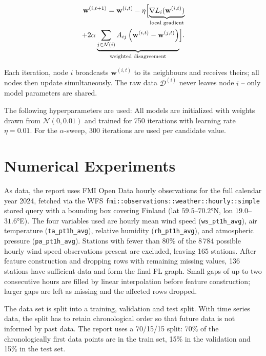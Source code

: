 \documentclass{article}
\begin{document}
\begin{equation*}
	\begin{split}
		\mathbf{w}^{(i,t+1)} = \mathbf{w}^{(i,t)} - \eta \Bigl[
		\underbrace{\nabla L_i(\mathbf{w}^{(i,t)})}_{\text{local gradient}} \\
			+ 2\alpha \underbrace{\sum_{j \in \mathcal{N}(i)} A_{ij}\left(\mathbf{w}^{(i,t)} - \mathbf{w}^{(j,t)}\right)}_{\text{weighted disagreement}} \Bigr].
	\end{split}
	\label{eq:fedgd}
\end{equation*}

Each iteration, node $i$ broadcasts $\mathbf{w}^{(i,t)}$ to its neighbours and receives
theirs; all nodes then update simultaneously. The raw data $\mathcal{D}^{(i)}$ never
leaves node $i$ -- only model parameters are shared.

The following hyperparameters are used: All models are initialized with weights
drawn from $\mathcal{N}(0, 0.01)$ and trained for 750 iterations with learning rate
$\eta = 0.01$. For the $\alpha$-sweep, 300 iterations are used per candidate value.

\section{Numerical Experiments}
\label{sec:experiments}

As data, the report uses FMI Open Data \cite{FMIOpenData} hourly observations for the
full calendar year 2024, fetched via the WFS \texttt{fmi::observations::weather::hourly::simple}
stored query with a bounding box covering Finland (lat $59.5$--$70.2$°N, lon $19.0$--$31.6$°E).
The four variables used are hourly mean wind speed (\texttt{ws\_pt1h\_avg}), air temperature
(\texttt{ta\_pt1h\_avg}), relative humidity (\texttt{rh\_pt1h\_avg}), and atmospheric pressure
(\texttt{pa\_pt1h\_avg}). Stations with fewer than 80\% of the 8\,784 possible hourly
wind speed observations present are excluded, leaving 165 stations. After feature
construction and dropping rows with remaining missing values, 136 stations have
sufficient data and form the final FL graph.
Small gaps of up to two consecutive hours are filled by linear interpolation before
feature construction; larger gaps are left as missing and the affected rows dropped.

The data set is split into a training, validation and test split. With time series data,
the split has to retain chronological order so that future data is not informed by past
data. The report uses a 70/15/15 split: 70\% of the chronologically first
data points are in the train set, 15\% in the validation and 15\% in the test set.
\end{document}
